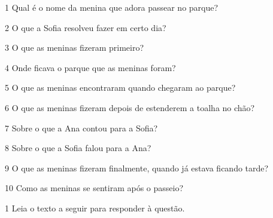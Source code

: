 
\num{1} Qual é o nome da menina que adora passear no parque?



\num{2} O que a Sofia resolveu fazer em certo dia?



\num{3} O que as meninas fizeram primeiro?



\num{4} Onde ficava o parque que as meninas foram?



\num{5} O que as meninas encontraram quando chegaram ao parque?



\num{6} O que as meninas fizeram depois de estenderem a toalha no chão?



\num{7} Sobre o que a Ana contou para a Sofia?



\num{8} Sobre o que a Sofia falou para a Ana?



\num{9} O que as meninas fizeram finalmente, quando já estava ficando tarde?



\num{10} Como as meninas se sentiram após o passeio?




\num{1} Leia o texto a seguir para responder à questão.

